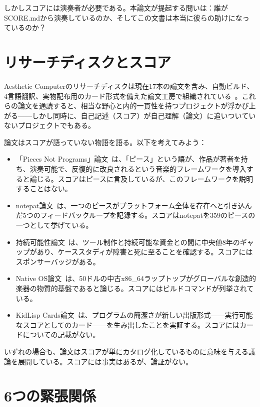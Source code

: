 \documentclass[10pt,letterpaper,twocolumn]{article}
\begin{document}
しかしスコアには演奏者が必要である。本論文が提起する問いは：誰がSCORE.mdから演奏しているのか、そしてこの文書は本当に彼らの助けになっているのか？

\section{リサーチディスクとスコア}

Aesthetic Computerのリサーチディスクは現在17本の論文を含み、自動ビルド、4言語翻訳、実物配布用のカード形式を備えた論文工房で組織されている~\citep{scudder2026cards}。これらの論文を通読すると、相当な野心と内的一貫性を持つプロジェクトが浮かび上がる——しかし同時に、自己記述（スコア）が自己理解（論文）に追いついていないプロジェクトでもある。

論文はスコアが語っていない物語を語る。以下を考えてみよう：

\begin{itemize}
\item 「Pieces Not Programs」論文~\citep{scudder2026pieces}は、「ピース」という語が、作品が著者を持ち、演奏可能で、反復的に改良されるという音楽的フレームワークを導入すると論じる。スコアはピースに言及しているが、このフレームワークを説明することはない。
\item notepat論文~\citep{scudder2026notepat}は、一つのピースがプラットフォーム全体を存在へと引き込んだ5つのフィードバックループを記録する。スコアはnotepatを359のピースの一つとして挙げている。
\item 持続可能性論文~\citep{scudder2026sustainability}は、ツール制作と持続可能な資金との間に中央値8年のギャップがあり、ケーススタディが障害と死に至ることを確認する。スコアにはスポンサーバッジがある。
\item Native OS論文~\citep{scudder2026os}は、50ドルの中古x86\_64ラップトップがグローバルな創造的楽器の物質的基盤であると論じる。スコアにはビルドコマンドが列挙されている。
\item KidLisp Cards論文~\citep{scudder2026cards}は、プログラムの簡潔さが新しい出版形式——実行可能なスコアとしてのカード——を生み出したことを実証する。スコアにはカードについての記載がない。
\end{itemize}

いずれの場合も、論文はスコアが単にカタログ化しているものに意味を与える議論を展開している。スコアには事実はあるが、論証がない。

\section{6つの緊張関係}
\end{document}
